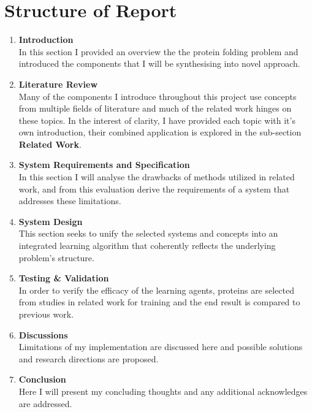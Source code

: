 \section{Structure of Report}
  \begin{enumerate}
      \item \textbf{Introduction} \\
         In this section I provided an overview the the protein folding problem and
         introduced the components that I will be synthesising into novel approach.
      \item \textbf{Literature Review} \\
         Many of the components I introduce throughout this project
         use concepts from multiple fields of literature and much of
         the related work hinges on these topics. In the interest of clarity, 
         I have provided each topic with it's own introduction, their combined
         application is explored in the sub-section \textbf{Related Work}. 
      \item \textbf{System Requirements and Specification} \\
         In this section I will analyse the drawbacks of methods utilized in related work,
         and from this evaluation derive the requirements of a system that
         addresses these limitations.
      \item \textbf{System Design}\\
         This section seeks to unify the selected systems and concepts
         into an integrated learning algorithm that coherently reflects
         the underlying problem's structure. 
      \item \textbf{Testing \& Validation} \\
         In order to verify the efficacy of the learning agents,
         proteins are selected from studies in related work for training
         and the end result is compared to previous work.
      \item  \textbf{Discussions} \\
         Limitations of my implementation are discussed here and
         possible solutions and research directions are proposed.
      \item  \textbf{Conclusion} \\
         Here I will present my concluding thoughts and any 
         additional acknowledges are addressed.
  \end{enumerate}

